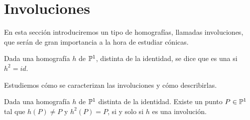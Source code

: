 \section{Involuciones}
En esta sección introduciremos un tipo de homografías, llamadas involuciones, que serán de gran importancia a la hora de estudiar cónicas.
\begin{defi}
	Dada una homografía $h$ de $\mathbb{P}^1$, distinta de la identidad, se dice que es una  si $h^2=id$.
\end{defi}
Estudiemos cómo se caracterizan las involuciones y cómo describirlas.
\begin{lem}
	Dada una homografía $h$ de $\mathbb{P}^1$ distinta de la identidad. Existe un punto $P\in\mathbb{P}^1$ tal que $h(P)\not=P$ y $h^2(P)=P$, si y solo si $h$ es una involución.
\end{lem}
